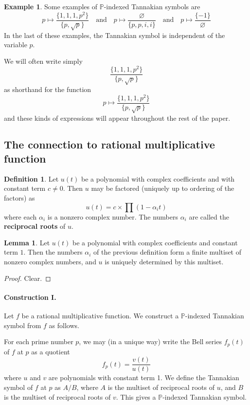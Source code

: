 \documentclass[a4paper]{article}
\theoremstyle{definition}
\newtheorem{definition}{Definition}[section]
\newtheorem{example}{Example}[section]
\newtheorem{lemma}[theorem]{Lemma}
\theoremstyle{remark}
\newcommand{\defhl}[1]{\textbf{#1}}
\begin{document}
\begin{example}
Some examples of $\mathbb{P}$-indexed Tannakian symbols are
$$ p \mapsto \frac{   \{  1,1, 1, p^2  \}   }{  \{  p, \sqrt{p}  \}   } \quad \textrm{and} \quad p \mapsto \frac{   \varnothing   }{  \{  p, p, i, i  \}   }   \quad \textrm{and} \quad p \mapsto \frac{  \{ -1  \}   }{     \varnothing }    $$
In the last of these examples, the Tannakian symbol is independent of the variable $p$. 
\end{example}

We will often write simply
$$  \frac{   \{  1,1, 1, p^2  \}   }{  \{  p, \sqrt{p}  \}   }$$
as shorthand for the function
$$ p \mapsto \frac{   \{  1,1, 1, p^2  \}   }{  \{  p, \sqrt{p}  \}   } $$
and these kinds of expressions will appear throughout the rest of the paper.

\subsection{The connection to rational multiplicative function}

\begin{definition}
Let $u(t)$ be a polynomial with complex coefficients and with constant term $c \neq 0$. Then $u$ may be factored (uniquely up to ordering of the factors) as 
$$  u(t) =  c \times \prod(1 - \alpha_i t)  $$
where each $\alpha_i$ is a nonzero complex number. The numbers $\alpha_i$ are called the \defhl{reciprocal roots} of $u$.
\end{definition}

\begin{lemma}
Let $u(t)$ be a polynomial with complex coefficients and constant term $1$. Then the numbers $\alpha_i$ of the previous definition form a finite multiset of nonzero complex numbers, and $u$ is uniquely determined by this multiset.
\end{lemma}
\begin{proof}
Clear.
\end{proof}

\paragraph{Construction I.} Let $f$ be a rational multiplicative function. We construct a $\mathbb{P}$-indexed Tannakian symbol from $f$ as follows.

For each prime number $p$, we may (in a unique way) write the Bell series $f_p(t)$ of $f$ at $p$ as a quotient
$$ f_p(t) = \frac{v(t)}{u(t) }   $$
where $u$ and $v$ are polynomials with constant term 1. We define the Tannakian symbol of $f$ at $p$ as $A/B$, where $A$ is the multiset of reciprocal roots of $u$, and $B$ is the multiset of reciprocal roots of $v$. This gives a $\mathbb{P}$-indexed Tannakian symbol.
\end{document}
